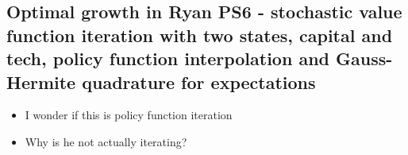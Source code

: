 \documentclass[11pt]{article}
\renewcommand{\[}{\begin{equation}}
\renewcommand{\]}{\end{equation}}
\DeclareMathOperator{\E}{\mathbb{E}}
\begin{document}
\subsection{Optimal growth in Ryan PS6 - stochastic value function iteration with two states, capital and tech, policy function interpolation and Gauss-Hermite quadrature for expectations}
\begin{itemize}
\item I wonder if this is policy function iteration
\item Why is he not actually iterating?
\end{itemize}


%
%
%
%
\end{document}
